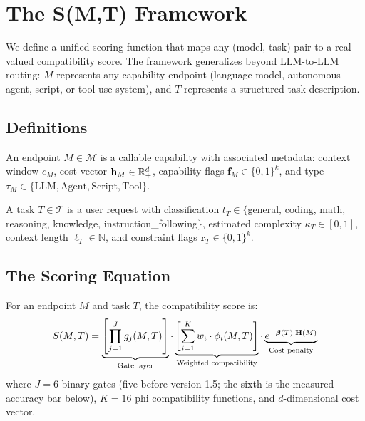 \section{The S(M,T) Framework}
\label{sec:framework}

We define a unified scoring function that maps any (model, task) pair to a real-valued compatibility score. The framework generalizes beyond LLM-to-LLM routing: $M$ represents any capability endpoint (language model, autonomous agent, script, or tool-use system), and $T$ represents a structured task description.

\subsection{Definitions}

\begin{definition}[Endpoint]
An endpoint $M \in \mathcal{M}$ is a callable capability with associated metadata: context window $c_M$, cost vector $\mathbf{h}_M \in \mathbb{R}^d_+$, capability flags $\mathbf{f}_M \in \{0,1\}^k$, and type $\tau_M \in \{\text{LLM}, \text{Agent}, \text{Script}, \text{Tool}\}$.
\end{definition}

\begin{definition}[Task]
A task $T \in \mathcal{T}$ is a user request with classification $t_T \in \{$general, coding, math, reasoning, knowledge, instruction\_following$\}$, estimated complexity $\kappa_T \in [0,1]$, context length $\ell_T \in \mathbb{N}$, and constraint flags $\mathbf{r}_T \in \{0,1\}^k$.
\end{definition}

\subsection{The Scoring Equation}

\begin{definition}[S(M,T) Score]
For an endpoint $M$ and task $T$, the compatibility score is:
\begin{equation}
\label{eq:smt}
S(M,T) = \underbrace{\left[\prod_{j=1}^{J} g_j(M,T)\right]}_{\text{Gate layer}} \cdot \underbrace{\left[\sum_{i=1}^{K} w_i \cdot \phi_i(M,T)\right]}_{\text{Weighted compatibility}} \cdot \underbrace{e^{-\boldsymbol{\beta}(T) \cdot \mathbf{H}(M)}}_{\text{Cost penalty}}
\end{equation}
where $J=6$ binary gates (five before version 1.5; the sixth is the measured accuracy bar below), $K=16$ phi compatibility functions, and $d$-dimensional cost vector.
\end{definition}

